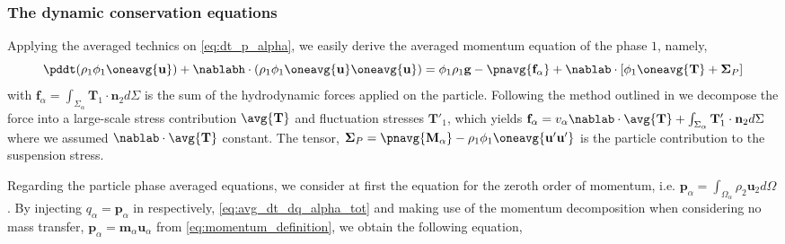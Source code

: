 \subsubsection{The dynamic conservation equations}

Applying the averaged technics on \ref{eq:dt_p_alpha}, we easily derive the averaged momentum  equation of the phase $1$, namely,
\begin{equation}
    \pddt (\rho_1\phi_1\oneavg{\textbf{u}})
    +  \nablabh \cdot (\rho_1\phi_1\oneavg{\textbf{u}} \oneavg{\textbf{u}})
    = 
     \phi_1 \rho_1 \textbf{g}
    - \pnavg{\textbf{f}_\alpha}
    +  \nablab \cdot \left[
        \phi_1\oneavg{ \textbf{T}}
        + \mathbf{\Sigma}_P
    \right]
    \label{eq:hybrid_avg_dt_rhou}
\end{equation}
with $\textbf{f}_\alpha = \int_{\Sigma_\alpha} \mathbf{T}_1 \cdot \textbf{n}_2d\Sigma$ is the sum of the hydrodynamic forces applied on the particle. 
Following the method outlined in \citet{chu2016flux} we decompose the force into a large-scale stress contribution $\avg{\textbf{T}}$ and fluctuation stresses $\textbf{T}'_1$, which yields $\textbf{f}_\alpha = v_\alpha \nablab \cdot\avg{\textbf{T}}+ \int_{\Sigma_\alpha} \mathbf{T}'_1 \cdot \textbf{n}_2d\Sigma$ where we assumed $\nablab\cdot\avg{\textbf{T}}$ constant. 
The tensor, $\mathbf{\Sigma}_P = \pnavg{\textbf{M}_\alpha} -  \rho_1\phi_1\oneavg{\textbf{u}'\textbf{u}'}$ is the particle contribution to the suspension stress.


Regarding the particle phase averaged equations, we consider at first the equation for the zeroth order of momentum, i.e. $\textbf{p}_\alpha = \int_{\Omega_\alpha} \rho_2 \textbf{u}_2 d\Omega$. 
By injecting $q_\alpha = \textbf{p}_\alpha$ in respectively, \ref{eq:avg_dt_dq_alpha_tot} and making use of the momentum decomposition when considering no mass transfer, $\textbf{p}_\alpha = \textbf{m}_\alpha \textbf{u}_\alpha$ from \ref{eq:momentum_definition},  
we obtain the following equation,

